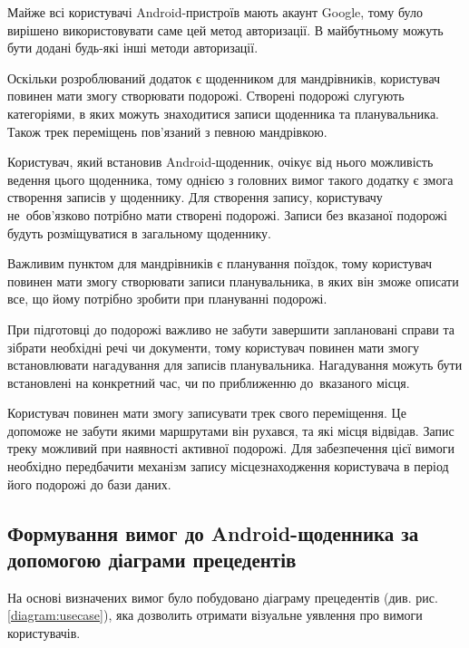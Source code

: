 \documentclass[../main.tex]{subfiles}
\begin{document}
Майже всі користувачі Android-пристроїв мають акаунт Google, тому було вирішено використовувати саме цей метод авторизації. В майбутньому можуть бути додані будь-які інші методи авторизації.

Оскільки розроблюваний додаток є щоденником для мандрівників, користувач повинен мати змогу створювати подорожі. Створені подорожі слугують категоріями, в яких можуть знаходитися записи щоденника та планувальника. Також трек переміщень пов'язаний з певною мандрівкою.

Користувач, який встановив Android-щоденник, очікує від нього можливість ведення цього щоденника, тому однією з головних вимог такого додатку є змога створення записів у щоденнику. Для створення запису, користувачу не~обов'язково потрібно мати створені подорожі. Записи без вказаної подорожі будуть розміщуватися в загальному щоденнику.

Важливим пунктом для мандрівників є планування поїздок, тому користувач повинен мати змогу створювати записи планувальника, в яких він зможе описати все, що йому потрібно зробити при плануванні подорожі.

При підготовці до подорожі важливо не забути завершити заплановані справи та зібрати необхідні речі чи документи, тому користувач повинен мати змогу встановлювати нагадування для записів планувальника. Нагадування можуть бути встановлені на конкретний час, чи по приближенню до~вказаного місця.

Користувач повинен мати змогу записувати трек свого переміщення. Це допоможе не забути якими маршрутами він рухався, та  які місця відвідав. Запис треку можливий при наявності активної подорожі. Для забезпечення цієї вимоги необхідно передбачити механізм запису місцезнаходження користувача в період його подорожі до бази даних.

\subsection{Формування вимог до Android-щоденника за допомогою діаграми прецедентів}
На основі визначених вимог було побудовано діаграму прецедентів (див. рис. \ref{diagram:usecase}), яка дозволить отримати візуальне уявлення про вимоги користувачів.
\end{document}
